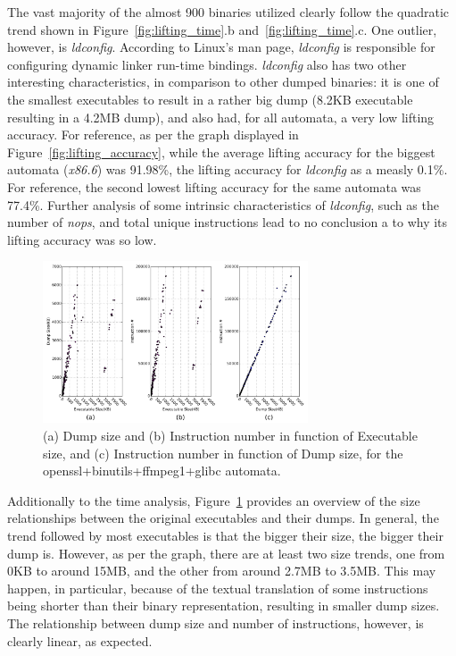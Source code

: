 \documentclass[12pt]{article}
\begin{document}
The vast majority of the almost 900 binaries utilized clearly follow the quadratic trend shown in Figure~\ref{fig:lifting_time}.b and~\ref{fig:lifting_time}.c. One outlier, however, is \textit{ldconfig}. According to Linux's man page, \textit{ldconfig} is responsible for configuring dynamic linker run-time bindings. \textit{ldconfig} also has two other interesting characteristics, in comparison to other dumped binaries: it is one of the smallest executables to result in a rather big dump (8.2KB executable resulting in a 4.2MB dump), and also had, for all automata, a very low lifting accuracy. For reference, as per the graph displayed in Figure~\ref{fig:lifting_accuracy}, while the average lifting accuracy for the biggest automata (\textit{x86.6}) was 91.98\%, the lifting accuracy for \textit{ldconfig} as a measly 0.1\%. For reference, the second lowest lifting accuracy for the same automata was 77.4\%. Further analysis of some intrinsic characteristics of \textit{ldconfig}, such as the number of \textit{nops}, and total unique instructions lead to no conclusion a to why its lifting accuracy was so low.

\begin{figure}[ht]
\centering
\includegraphics[width=0.7\textwidth]{size}%
\caption{(a) Dump size and (b) Instruction number in function of Executable size, and (c) Instruction number in function of Dump size, for the openssl+binutils+ffmpeg1+glibc automata. }
\label{fig:size}
\end{figure}

Additionally to the time analysis, Figure~\ref{fig:size} provides an overview of the size relationships between the original executables and their dumps. In general, the trend followed by most executables is that the bigger their size, the bigger their dump is. However, as per the graph, there are at least two size trends, one from 0KB to around 15MB, and the other from around 2.7MB to 3.5MB. This may happen, in particular, because of the textual translation of some instructions being shorter than their binary representation, resulting in smaller dump sizes. The relationship between dump size and number of instructions, however, is clearly linear, as expected. 
\end{document}
